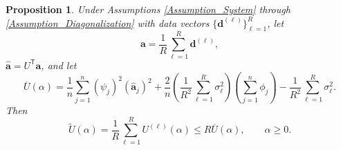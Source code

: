 \documentclass[12pt]{article}
\newcommand{\aVec}{\mathbf{a}}	%
\newcommand{\dVec}{\mathbf{d}}	%
\newcommand{\trans}[1]{{#1}^\mathsf{T}}	%
\newcommand{\dft}[1]{\widehat{#1}}	%
\newcommand{\regparam}{\alpha}
\newcommand{\filt}{\phi}
\newcommand{\mfilt}{\psi}
\newcommand{\noiseSD}{\sigma}	%
\newcommand{\U}{U}	%
\newtheorem{proposition}{Proposition}[section]
\begin{document}
\begin{proposition}
Under Assumptions \ref{Assumption_System} through \ref{Assumption_Diagonalization} with data vectors $\{\dVec^{(\ell)}\}_{\ell=1}^R$, let 
\begin{equation}
\label{eq:Averaged data}
\aVec = \frac{1}{R}\sum_{\ell=1}^R \dVec^{(\ell)},
\end{equation}
$\dft{\aVec} = \trans{U}\aVec$, and let
\begin{equation}
\label{eq:UPRE of Average}
\overline{U}(\regparam) = \frac{1}{n}\sum_{j=1}^{n} \left(\mfilt_j\right)^2\left(\dft{\aVec}_j\right)^2 + \frac{2}{n} \left(\frac{1}{R^2} \sum_{\ell=1}^R \noiseSD_\ell^2\right) \left(\sum_{j=1}^{n} \filt_j\right) - \frac{1}{R^2} \sum_{\ell=1}^R\noiseSD_\ell^2.
\end{equation}
Then
\begin{equation}
\label{eq:UPRE Bound}
\widetilde{U}(\regparam) = \frac{1}{R} \sum_{\ell=1}^R \U^{(\ell)}(\regparam) \leq R \overline{U}(\regparam), \qquad \regparam \geq 0.
\end{equation}
\end{proposition}
\end{document}
